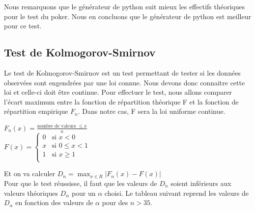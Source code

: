 \documentclass[10pt,a4paper]{article}
\begin{document}
Nous remarquons que le générateur de python suit mieux les effectifs théoriques pour le test du poker. Nous en concluons que le générateur de python est meilleur pour ce test.

\subsection{Test de Kolmogorov-Smirnov}
Le test de Kolmogorov-Smirnov est un test permettant de tester si les données observées sont engendrées par une loi connue. Nous devons donc connaitre cette loi et celle-ci doit être continue. Pour effectuer le test, nous allons comparer l'écart maximum entre la fonction de répartition théorique F et la fonction de répartition empirique $F_n$. Dans notre cas, F sera la loi uniforme continue.
\begin{center}
 $ F_n(x) = \frac{\text{nombre de valeurs } \leq x}{n}$\\ 
 $ F(x) =
\left\{
	\begin{array}{lll}
		0  & \mbox{si  } x < 0 \\
		x & \mbox{si  } 0 \leq x < 1 \\
		1 & \mbox{si  } x \geq 1 \\
	\end{array}
\right.
$
\end{center}
Et on va calculer $D_n = \max_{x\in R} |F_n(x)-F(x)|$ \\
Pour que le test réussisse, il faut que les valeurs de $D_n$ soient inférieurs aux valeurs théoriques $D_\alpha$ pour un $\alpha$ choisi. Le tableau suivant reprend les valeurs de $D_\alpha$ en fonction des valeurs de $\alpha$ pour des $n > 35$. 
\end{document}
